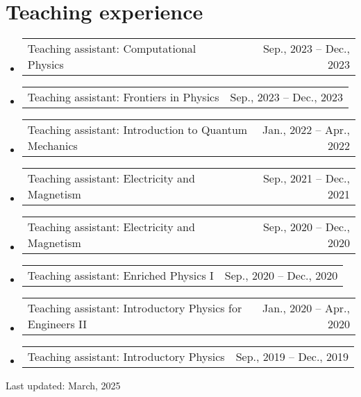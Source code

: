 \documentclass[letterpaper,11pt]{article}
\makeatletter
\newcommand{\TeachingItem}[2]{
	\item{\vspace{-1pt}
		\begin{tabular*}{0.92\textwidth}{l@{\extracolsep{\fill}}r}
			{#1} & {#2}
		\end{tabular*}
		\vspace{-5pt}
	}
}
\makeatother
\begin{document}
\section*{Teaching experience}
\begin{itemize}[leftmargin=*]
	\TeachingItem{Teaching assistant: Computational Physics}{Sep., 2023 -- Dec., 2023}
	\TeachingItem{Teaching assistant: Frontiers in Physics}{Sep., 2023 -- Dec., 2023}
	\TeachingItem{Teaching assistant: Introduction to Quantum Mechanics}{Jan., 2022 -- Apr., 2022}
	\TeachingItem{Teaching assistant: Electricity and Magnetism}{Sep., 2021 -- Dec., 2021}
	\TeachingItem{Teaching assistant: Electricity and Magnetism}{Sep., 2020 -- Dec., 2020}
	\TeachingItem{Teaching assistant: Enriched Physics I}{Sep., 2020 -- Dec., 2020}
	\TeachingItem{Teaching assistant: Introductory Physics for Engineers II}{Jan., 2020 -- Apr., 2020}
	\TeachingItem{Teaching assistant: Introductory Physics}{Sep., 2019 -- Dec., 2019}
\end{itemize}

\vspace{1cm}

\begin{flushright}
	Last updated: March, 2025
\end{flushright}
\end{document}
